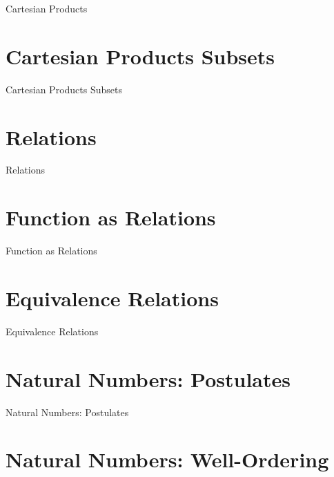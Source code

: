 Cartesian Products

\section{Cartesian Products Subsets}
\label{sec:cartesian-products-subsets}

Cartesian Products Subsets

\section{Relations}
\label{sec:relations}

Relations

\section{Function as Relations}
\label{sec:function-as-relations}

Function as Relations

\section{Equivalence Relations}
\label{sec:equivalence-relations}

Equivalence Relations

\section{Natural Numbers: Postulates}
\label{sec:natural-numbers-postulates}

Natural Numbers: Postulates

\section{Natural Numbers: Well-Ordering}
\label{sec:natural-numbers-well-ordering}

